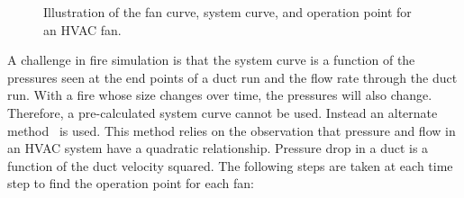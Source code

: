 \begin{figure}[ht!]
   \begin{center}
      \caption[Illustration of the fan curve, system curve, and operation point for an HVAC fan]{\label{hvac_curves} Illustration of the fan curve, system curve, and operation point for an HVAC fan.}
   \end{center}
\end{figure}

A challenge in fire simulation is that the system curve is a function of the pressures seen at the end points of a duct run and the flow rate through the duct run. With a fire whose size changes over time, the pressures will also change. Therefore, a pre-calculated system curve cannot be used. Instead an alternate method~\cite{Ralph:2} is used. This method relies on the observation that pressure and flow in an HVAC system have a quadratic relationship. Pressure drop in a duct is a function of the duct velocity squared. The following steps are taken at each time step to find the operation point for each fan:

